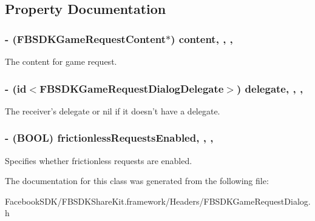 \subsection{Property Documentation}
\hypertarget{interface_f_b_s_d_k_game_request_dialog_a604de6e2ac12fb1e5fb60f5546db09d0}{
\subsubsection[{content}]{\setlength{\rightskip}{0pt plus 5cm}-\/ ({\bf F\-B\-S\-D\-K\-Game\-Request\-Content}$\ast$) content\hspace{0.3cm}{\ttfamily [read]}, {\ttfamily [write]}, {\ttfamily [nonatomic]}, {\ttfamily [copy]}}}\label{interface_f_b_s_d_k_game_request_dialog_a604de6e2ac12fb1e5fb60f5546db09d0}
The content for game request. \hypertarget{interface_f_b_s_d_k_game_request_dialog_ac33aec2227f6156213a0f8a734d040b2}{
\subsubsection[{delegate}]{\setlength{\rightskip}{0pt plus 5cm}-\/ (id$<${\bf F\-B\-S\-D\-K\-Game\-Request\-Dialog\-Delegate}$>$) delegate\hspace{0.3cm}{\ttfamily [read]}, {\ttfamily [write]}, {\ttfamily [nonatomic]}, {\ttfamily [weak]}}}\label{interface_f_b_s_d_k_game_request_dialog_ac33aec2227f6156213a0f8a734d040b2}
The receiver's delegate or nil if it doesn't have a delegate. \hypertarget{interface_f_b_s_d_k_game_request_dialog_a4bb722ee3374be16b2eb9a544f40ca9f}{
\subsubsection[{frictionless\-Requests\-Enabled}]{\setlength{\rightskip}{0pt plus 5cm}-\/ (B\-O\-O\-L) frictionless\-Requests\-Enabled\hspace{0.3cm}{\ttfamily [read]}, {\ttfamily [write]}, {\ttfamily [nonatomic]}, {\ttfamily [assign]}}}\label{interface_f_b_s_d_k_game_request_dialog_a4bb722ee3374be16b2eb9a544f40ca9f}
Specifies whether frictionless requests are enabled. 

The documentation for this class was generated from the following file\-:\begin{DoxyCompactItemize}
\item 
Facebook\-S\-D\-K/\-F\-B\-S\-D\-K\-Share\-Kit.\-framework/\-Headers/F\-B\-S\-D\-K\-Game\-Request\-Dialog.\-h\end{DoxyCompactItemize}
